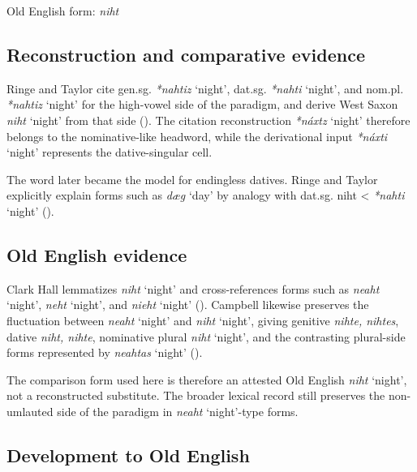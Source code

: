 \documentclass[
  british,
  a4paper,
  openany]{book}
\providecommand{\Recon}[1]{\emph{*#1}}
{\catcode`→=\active \global\def→{\ensuremath{\rightarrow}}}
\providecommand{\Recon}[1]{\emph{*#1}}
{\catcode`→=\active \global\def→{\ensuremath{\rightarrow}}}
\begin{document}
Old English form: \emph{niht}

\subsection{Reconstruction and comparative
evidence}\label{reconstruction-and-comparative-evidence-120}

Ringe and Taylor cite gen.sg. \Recon{nahtiz} `night', dat.sg.
\Recon{nahti} `night', and nom.pl. \Recon{nahtiz} `night' for the
high-vowel side of the paradigm, and derive West Saxon {\emph{niht}}
`night' from that side (). The citation reconstruction {\Recon{náxtz} `night'}
therefore belongs to the nominative-like headword, while the
derivational input {\Recon{náxti} `night'} represents the
dative-singular cell.

The word later became the model for endingless datives. Ringe and Taylor
explicitly explain forms such as {\emph{dæg}} `day' by analogy with
dat.sg. niht \textless{} \Recon{nahti} `night'
().

\subsection{Old English evidence}\label{old-english-evidence-120}

Clark Hall lemmatizes {\emph{niht}} `night' and cross-references forms
such as {\emph{neaht}} `night', {\emph{neht}} `night', and
{\emph{nieht}} `night' (). Campbell likewise preserves the fluctuation between
{\emph{neaht}} `night' and {\emph{niht}} `night', giving genitive
\emph{nihte, nihtes}, dative \emph{niht, nihte}, nominative plural
\emph{niht} `night', and the contrasting plural-side forms represented
by {\emph{neahtas}} `night' ().

The comparison form used here is therefore an attested Old English
\emph{niht} `night', not a reconstructed substitute. The broader lexical
record still preserves the non-umlauted side of the paradigm in
{\emph{neaht}} `night'-type forms.

\subsection{Development to Old
English}\label{development-to-old-english-120}
\end{document}
